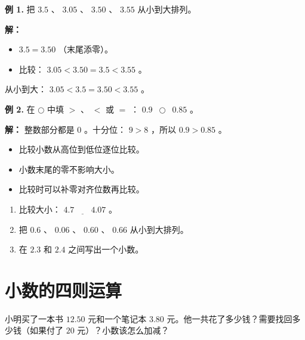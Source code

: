 \begin{workedexamples}


\textbf{例 1.} 把 $3.5$ 、 $3.05$ 、 $3.50$ 、 $3.55$ 从小到大排列。

\textbf{解：}
\begin{itemize}
  \item $3.5 = 3.50$ （末尾添零）。
  \item 比较： $3.05 < 3.50 = 3.5 < 3.55$ 。
\end{itemize}


从小到大： $3.05 < 3.5 = 3.50 < 3.55$ 。

\textbf{例 2.} 在 $\bigcirc$ 中填 $>$ 、 $<$ 或 $=$ ： $0.9 \enspace\bigcirc\enspace 0.85$ 。

\textbf{解：} 整数部分都是 $0$ 。十分位： $9 > 8$ ，所以 $0.9 > 0.85$ 。

\end{workedexamples}

\begin{keytakeaway}


\begin{itemize}
  \item 比较小数从高位到低位逐位比较。
  \item 小数末尾的零不影响大小。
  \item 比较时可以补零对齐位数再比较。
\end{itemize}


\end{keytakeaway}

\begin{practice}


\begin{enumerate}
  \item 比较大小： $4.7 \enspace\underline{\quad}\enspace 4.07$ 。
  \item 把 $0.6$ 、 $0.06$ 、 $0.60$ 、 $0.66$ 从小到大排列。
  \item 在 $2.3$ 和 $2.4$ 之间写出一个小数。
\end{enumerate}


\end{practice}

\section*{小数的四则运算}


\begin{explore}


小明买了一本书 $12.50$ 元和一个笔记本 $3.80$ 元。他一共花了多少钱？需要找回多少钱（如果付了 $20$ 元）？小数该怎么加减？

\end{explore}

